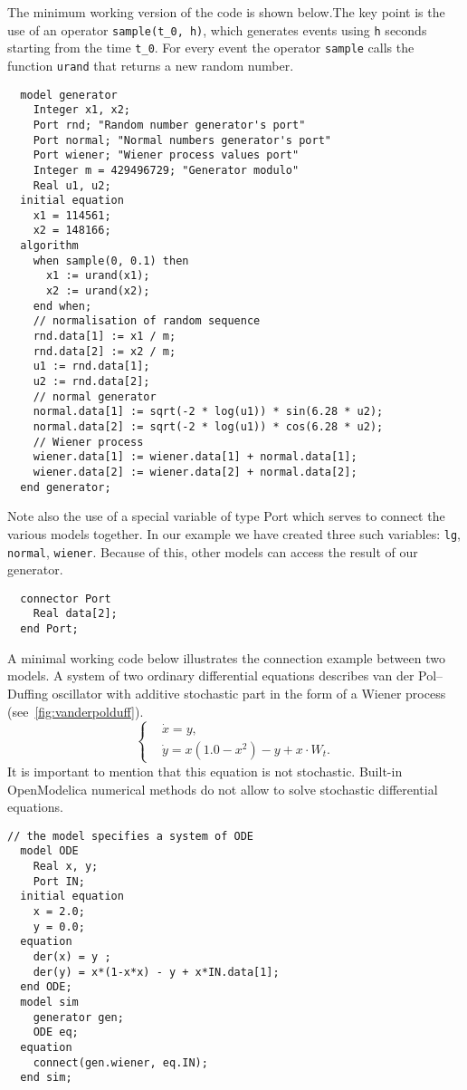 \documentclass[%
floatfix,
showkeys,
nofootinbib, %
superscriptaddress, %
]{revtex4-1}
\begin{document}
The minimum working version of the code is shown below.The key point
is the use of an operator \verb|sample(t_0, h)|, which generates
events using \verb|h| seconds starting from the time \verb|t_0|. For
every event the operator \verb|sample| calls the function \verb|urand|
that returns a new random number.

\begin{verbatim}
  model generator
    Integer x1, x2;
    Port rnd; "Random number generator's port"
    Port normal; "Normal numbers generator's port"
    Port wiener; "Wiener process values port"
    Integer m = 429496729; "Generator modulo"
    Real u1, u2;
  initial equation
    x1 = 114561;
    x2 = 148166;
  algorithm
    when sample(0, 0.1) then
      x1 := urand(x1);
      x2 := urand(x2);
    end when;
    // normalisation of random sequence
    rnd.data[1] := x1 / m;
    rnd.data[2] := x2 / m;
    u1 := rnd.data[1];
    u2 := rnd.data[2];
    // normal generator
    normal.data[1] := sqrt(-2 * log(u1)) * sin(6.28 * u2);
    normal.data[2] := sqrt(-2 * log(u1)) * cos(6.28 * u2);
    // Wiener process
    wiener.data[1] := wiener.data[1] + normal.data[1];
    wiener.data[2] := wiener.data[2] + normal.data[2];
  end generator;
\end{verbatim}

Note also the use of a special variable of type Port which serves to
connect the various models together. In our example we have created
three such variables: \verb|lg|, \verb|normal|, \verb|wiener|. Because
of this, other models can access the result of our generator.

\begin{verbatim}
  connector Port
    Real data[2];
  end Port;
\end{verbatim}

A minimal working code below illustrates the connection example
between two models. A system of two ordinary differential equations
describes van der Pol–Duffing oscillator with additive stochastic part
in the form of a Wiener process (see~\ref{fig:vanderpolduff}).
\[
  \left\{
  \begin{aligned}
    & \dot{x} = y,\\
    & \dot{y} = x(1.0 - x^{2}) - y + x\cdot W_{t}.
  \end{aligned}
  \right.
\]
It is important to mention that this equation is not
stochastic. Built-in OpenModelica numerical methods do not allow to
solve stochastic differential equations.

\begin{verbatim}
// the model specifies a system of ODE
  model ODE
    Real x, y;
    Port IN;
  initial equation
    x = 2.0;
    y = 0.0;
  equation
    der(x) = y ;
    der(y) = x*(1-x*x) - y + x*IN.data[1];
  end ODE;
  model sim
    generator gen;
    ODE eq;
  equation
    connect(gen.wiener, eq.IN);
  end sim;
\end{verbatim}
\end{document}
